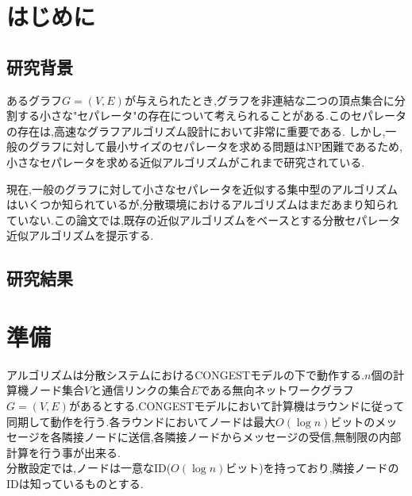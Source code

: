 \documentclass{thesis}
\theoremstyle{definition}
\begin{document}
\baselineskip=22pt
\pagestyle{empty}

\maketitle

\pagestyle{myheadings}	%
\tableofcontents

\newpage


\chapter{はじめに}

\section{研究背景}

あるグラフ$G=(V,E)$が与えられたとき,グラフを非連結な二つの頂点集合に分割する小さな"セパレータ"の存在について考えられることがある.このセパレータの存在は,高速なグラフアルゴリズム設計において非常に重要である.
しかし,一般のグラフに対して最小サイズのセパレータを求める問題はNP困難であるため,小さなセパレータを求める近似アルゴリズムがこれまで研究されている.\par
現在,一般のグラフに対して小さなセパレータを近似する集中型のアルゴリズムはいくつか知られているが,分散環境におけるアルゴリズムはまだあまり知られていない.この論文では,既存の近似アルゴリズムをベースとする分散セパレータ近似アルゴリズムを提示する.

\section{研究結果}

\chapter{準備}
アルゴリズムは分散システムにおけるCONGESTモデルの下で動作する.$n$個の計算機ノード集合$V$と通信リンクの集合$E$である無向ネットワークグラフ$G=(V,E)$があるとする.CONGESTモデルにおいて計算機はラウンドに従って同期して動作を行う.各ラウンドにおいてノードは最大$O(\log n)$ビットのメッセージを各隣接ノードに送信,各隣接ノードからメッセージの受信,無制限の内部計算を行う事が出来る.\\
分散設定では,ノードは一意なID($O(\log n)$ビット)を持っており,隣接ノードのIDは知っているものとする.\par
\end{document}
